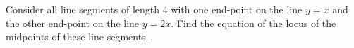Consider all line segments of length 4 with one end-point on the line $y=x$ and the other end-point on the line $y=2x$. Find the equation of the locus of the midpoints of these line segments.